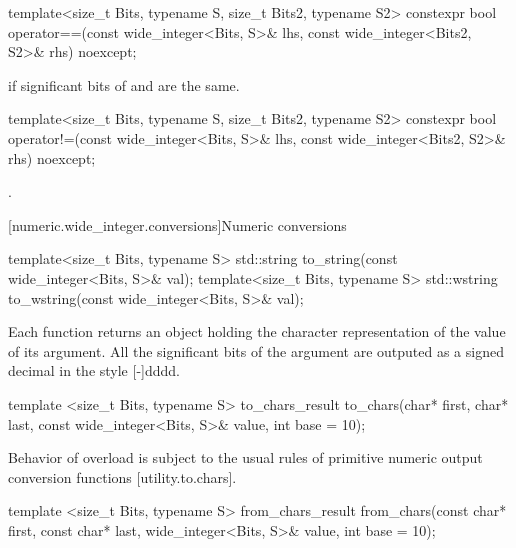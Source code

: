 \begin{itemdecl}
template<size_t Bits, typename S, size_t Bits2, typename S2>
  constexpr bool operator==(const wide_integer<Bits, S>& lhs,
                            const wide_integer<Bits2, S2>& rhs) noexcept;
\end{itemdecl}

\begin{itemdescr}
\returns {} if significant bits of  and  are the same.
\end{itemdescr}

\begin{itemdecl}
template<size_t Bits, typename S, size_t Bits2, typename S2>
  constexpr bool operator!=(const wide_integer<Bits, S>& lhs,
                            const wide_integer<Bits2, S2>& rhs) noexcept;
\end{itemdecl}

\begin{itemdescr}
\returns {}.
\end{itemdescr}

[numeric.wide_integer.conversions]{Numeric conversions}

\begin{itemdecl}
template<size_t Bits, typename S> std::string to_string(const wide_integer<Bits, S>& val);
template<size_t Bits, typename S> std::wstring to_wstring(const wide_integer<Bits, S>& val);
\end{itemdecl}

\begin{itemdescr}
\returns Each function returns an object holding the character representation of the value of its argument. All the significant bits of the argument are outputed as a signed decimal in the style [-]dddd.
\end{itemdescr}

\begin{itemdecl}
template <size_t Bits, typename S>
  to_chars_result to_chars(char* first, char* last, const wide_integer<Bits, S>& value,
                           int base = 10);
\end{itemdecl}

Behavior of  overload is subject to the usual rules of primitive numeric output conversion functions [utility.to.chars].

\begin{itemdecl}
template <size_t Bits, typename S>
  from_chars_result from_chars(const char* first, const char* last, wide_integer<Bits, S>& value,
                               int base = 10);
\end{itemdecl}

